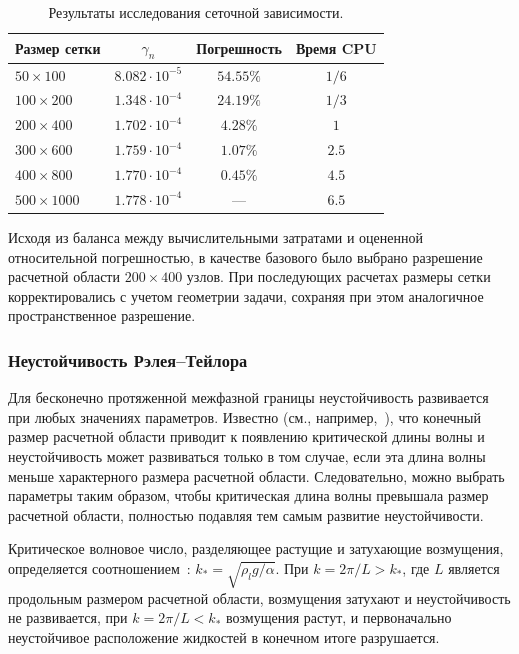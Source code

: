 \documentclass[12pt,a4paper]{article}
\begin{document}
\begin{table}
	\centering
	\caption{Результаты исследования сеточной зависимости.}
	\label{tab:RT-grid_LBM}
	\begin{tabular}{lccc}
		\hline
		Размер сетки & $\gamma_n$ & Погрешность & Время CPU \\
		\hline
		$50\times100$   & $8.082\cdot10^{-5}$  & $54.55\%$ & $1/6$ \\
		$100\times200$  & $1.348\cdot10^{-4}$  & $24.19\%$  & $1/3$ \\
		$200\times400$  & $1.702\cdot10^{-4}$  & $4.28\%$   & $1$ \\
		$300\times600$  & $1.759\cdot10^{-4}$  & $1.07\%$   & $2.5$ \\
		$400\times800$  & $1.770\cdot10^{-4}$  & $0.45\%$  & $4.5$ \\
		$500\times1000$ & $1.778\cdot10^{-4}$  & ---       & $6.5$ \\
		\hline
	\end{tabular}
\end{table}

Исходя из баланса между вычислительными затратами и оцененной относительной погрешностью, в качестве базового было выбрано разрешение расчетной области $200\times400$ узлов. При последующих расчетах размеры сетки корректировались с учетом геометрии задачи, сохраняя при этом аналогичное пространственное разрешение.

\subsubsection{Неустойчивость Рэлея--Тейлора}

Для бесконечно протяженной межфазной границы неустойчивость развивается при любых значениях параметров. Известно (см., например,~\cite{Chandrasekhar1981, Sharp1984}), что конечный размер расчетной области приводит к появлению критической длины волны и неустойчивость может развиваться только в том случае, если эта длина волны меньше характерного размера расчетной области. Следовательно, можно выбрать параметры таким образом, чтобы критическая длина волны превышала размер расчетной области, полностью подавляя тем самым развитие неустойчивости.

Критическое волновое число, разделяющее растущие и затухающие возмущения, определяется соотношением~\cite{Briskman1976, Bezdenezhnykh1982, Bezdenezhnykh1983}: $k_* = \sqrt {\rho_l g/\alpha}.$
При $k = 2\pi/L > k_*$, где $L$ является продольным размером расчетной области, возмущения затухают и неустойчивость не развивается, при $k = 2\pi/L < k_*$ возмущения растут, и первоначально неустойчивое расположение жидкостей в конечном итоге разрушается.
\end{document}
